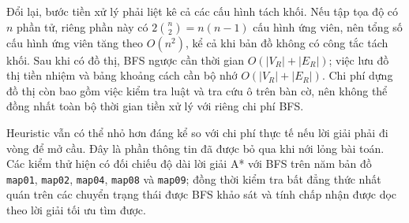 Đổi lại, bước tiền xử lý phải liệt kê cả các cấu hình tách khối.
Nếu tập tọa độ có $n$ phần tử, riêng phần này có
$2\binom{n}{2}=n(n-1)$ cấu hình ứng viên, nên tổng số cấu hình ứng
viên tăng theo $O(n^2)$, kể cả khi bản đồ không có công tắc tách khối.
Sau khi có đồ thị, BFS ngược cần thời gian
$O(|V_R|+|E_R|)$; việc lưu đồ thị tiền nhiệm và bảng khoảng cách cần
bộ nhớ $O(|V_R|+|E_R|)$. Chi phí dựng đồ thị còn bao gồm việc kiểm tra
luật và tra cứu ô trên bàn cờ, nên không thể đồng nhất toàn bộ thời
gian tiền xử lý với riêng chi phí BFS.

Heuristic vẫn có thể nhỏ hơn đáng kể so với chi phí thực tế nếu lời
giải phải đi vòng để mở cầu. Đây là phần thông tin đã được bỏ qua
khi nới lỏng bài toán. Các kiểm thử hiện có đối chiếu độ dài lời giải
A* với BFS trên năm bản đồ \texttt{map01}, \texttt{map02},
\texttt{map04}, \texttt{map08} và \texttt{map09}; đồng thời kiểm tra
bất đẳng thức nhất quán trên các chuyển trạng thái được BFS khảo sát
và tính chấp nhận được dọc theo lời giải tối ưu tìm được.
